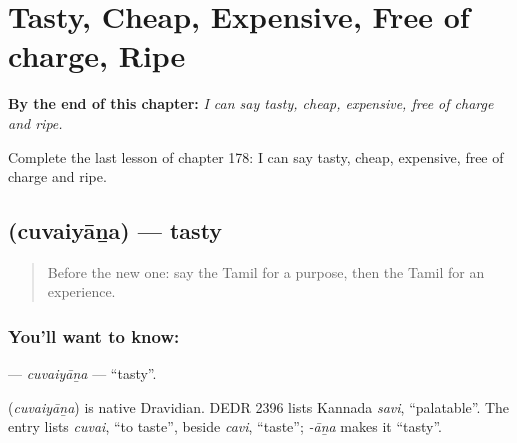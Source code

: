 
\chapter{Tasty, Cheap, Expensive, Free of charge, Ripe}
\label{ch:ta-tasty-cheap-expensive-free-of-charge-ripe}

\begin{chapteropening}
\textbf{By the end of this chapter:} \emph{I can say tasty, cheap, expensive, free of charge and ripe.}

Complete the last lesson of chapter 178: I can say tasty, cheap, expensive, free of charge and ripe.
\end{chapteropening}

\section[\texorpdfstring{\ta{சுவையான} (cuvaiyāṉa)}{சுவையான (cuvaiyāṉa)}]{ (cuvaiyāṉa) — tasty}

\label{lesson:TA-C178-cuvaiyana}



\begin{quote}
Before the new one: say the Tamil for a purpose, then the Tamil for an experience.
\end{quote}

\subsection*{You'll want to know: }
\textbf{} — \emph{cuvaiyāṉa} — \textquotedblleft{}tasty\textquotedblright{}.

\begin{cousinweb}
\textbf{} (\emph{cuvaiyāṉa}) is native Dravidian. DEDR 2396 lists Kannada \emph{savi}, \textquotedblleft{}palatable\textquotedblright{}. The entry lists \emph{cuvai}, \textquotedblleft{}to taste\textquotedblright{}, beside \emph{cavi}, \textquotedblleft{}taste\textquotedblright{}; \emph{-āṉa} makes it \textquotedblleft{}tasty\textquotedblright{}.
\end{cousinweb}

